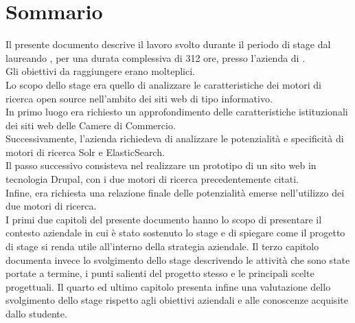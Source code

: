 
\cleardoublepage
{}
{}
\begingroup
\let\clearpage\relax
\let\cleardoublepage\relax
\let\cleardoublepage\relax

\chapter*{Sommario}

Il presente documento descrive il lavoro svolto durante il periodo di stage dal laureando \autore, per una durata complessiva di 312 ore, presso l'azienda \nomeAzienda di \locazioneAzienda. \\
Gli obiettivi da raggiungere erano molteplici. \\
Lo scopo dello stage era quello di analizzare le caratteristiche dei motori di ricerca \gls{open source} nell'ambito dei siti web di tipo informativo.\\
In primo luogo era richiesto un approfondimento delle caratteristiche istituzionali dei siti web delle Camere di Commercio. \\
Successivamente, l'azienda richiedeva di analizzare le potenzialità e specificità di motori di ricerca \gls{Solr} e \gls{ElasticSearch}. \\
Il passo successivo consisteva nel realizzare un prototipo di un sito web in tecnologia \gls{Drupal}, con i due motori di ricerca precedentemente citati. \\
Infine, era richiesta una relazione finale delle potenzialità emerse nell'utilizzo dei due motori di ricerca. \\
I primi due capitoli del presente documento hanno lo scopo di presentare il contesto aziendale in cui è stato sostenuto lo stage e di spiegare come il progetto di stage si renda utile all’interno della strategia aziendale. Il terzo capitolo documenta invece lo svolgimento dello stage descrivendo le attività che sono state portate a termine, i punti salienti del progetto stesso e le principali scelte progettuali. Il quarto ed ultimo capitolo presenta
infine una valutazione dello svolgimento dello stage rispetto agli obiettivi aziendali e alle conoscenze acquisite dallo studente.


\endgroup

\vfill